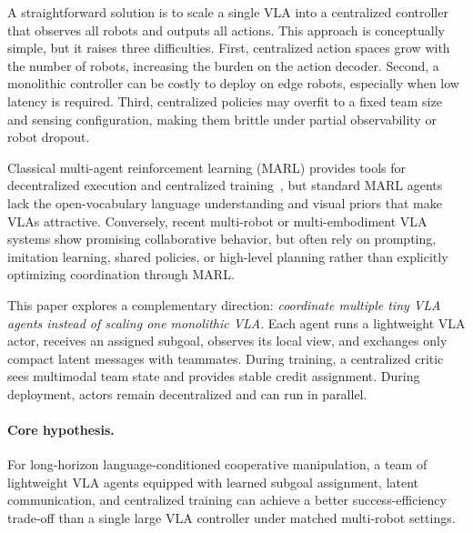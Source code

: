 \documentclass[11pt]{article}
\begin{document}
A straightforward solution is to scale a single VLA into a centralized controller that observes all robots and outputs all actions. This approach is conceptually simple, but it raises three difficulties. First, centralized action spaces grow with the number of robots, increasing the burden on the action decoder. Second, a monolithic controller can be costly to deploy on edge robots, especially when low latency is required. Third, centralized policies may overfit to a fixed team size and sensing configuration, making them brittle under partial observability or robot dropout.

Classical multi-agent reinforcement learning (MARL) provides tools for decentralized execution and centralized training~\citep{lowe2017maddpg,yu2022mappo}, but standard MARL agents lack the open-vocabulary language understanding and visual priors that make VLAs attractive. Conversely, recent multi-robot or multi-embodiment VLA systems show promising collaborative behavior, but often rely on prompting, imitation learning, shared policies, or high-level planning rather than explicitly optimizing coordination through MARL.

This paper explores a complementary direction: \emph{coordinate multiple tiny VLA agents instead of scaling one monolithic VLA}. Each agent runs a lightweight VLA actor, receives an assigned subgoal, observes its local view, and exchanges only compact latent messages with teammates. During training, a centralized critic sees multimodal team state and provides stable credit assignment. During deployment, actors remain decentralized and can run in parallel.

\paragraph{Core hypothesis.}
For long-horizon language-conditioned cooperative manipulation, a team of lightweight VLA agents equipped with learned subgoal assignment, latent communication, and centralized training can achieve a better success-efficiency trade-off than a single large VLA controller under matched multi-robot settings.
\end{document}

